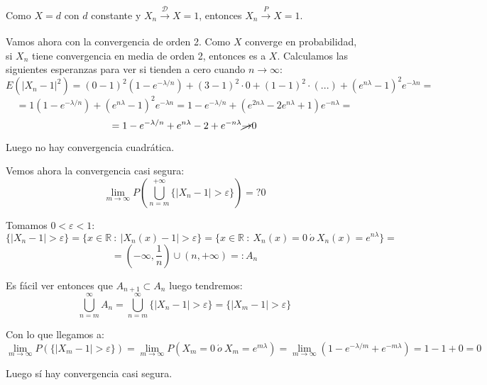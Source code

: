 \documentclass[openany]{book}
\begin{document}
\begin{exercise}
    Como $ X = d $ con $ d $ constante y $ X_n \xrightarrow[]{\mathcal{D}} X = 1 $, entonces $ X_n \xrightarrow[]{P} X=1 $.

    Vamos ahora con la convergencia de orden 2. Como $ X $ converge en probabilidad, si $ X_n $ tiene convergencia en media de orden 2, entonces es a $ X $. Calculamos las siguientes esperanzas para ver si tienden a cero cuando $ n\to\infty $:
    $$ E(|X_n-1|^2) = (0-1)^2 (1-e^{-\lambda/n})+(3-1)^2\cdot 0 + (1-1)^2\cdot (...) + (e^{n\lambda}-1)^2 e^{-\lambda n} = $$ 
    $$=1(1-e^{-\lambda/n}) + (e^{n\lambda}-1)^2e^{-\lambda n} = 1-e^{-\lambda/n} +(e^{2n\lambda}-2e^{n\lambda}+1)e^{-n\lambda} = $$
    $$ = 1-e^{-\lambda/n} + e^{n\lambda}-2+e^{-n\lambda} \cancel{\to} 0 $$

    Luego no hay convergencia cuadrática.

    Vemos ahora la convergencia casi segura:
    $$ \lim_{m \to \infty} P \left( \bigcup_{n = m}^{+\infty} \{|X_n-1|>\varepsilon\} \right) =? 0 $$

    Tomamos $ 0 < \varepsilon <1 $:
    $$ \{|X_n-1|>\varepsilon\} = \{x \in \mathbb{R}\ :\ |X_n(x)-1|>\varepsilon\} = \{x \in \mathbb{R}\ :\ X_n(x) = 0\ \acute o\ X_n (x) = e^{n\lambda}\} =$$
    $$  = (-\infty,\dfrac{1}{n}) \cup (n,+\infty) =: A_n $$

    Es fácil ver entonces que $ A_{n+1}\subset A_n $ luego tendremos:
    $$ \bigcup_{n=m}^{\infty} A_n = \bigcup_{n=m}^{\infty}\{|X_n-1|>\varepsilon\} = \{|X_m-1|>\varepsilon\}$$

    Con lo que llegamos a:
    $$ \lim_{m \to \infty}P(\{|X_m-1|>\varepsilon\}) = \lim_{m \to \infty}P(X_m = 0\ \acute o\ X_m = e^{m\lambda}) = \lim_{m \to \infty}(1-e^{-\lambda/m}+e^{-m\lambda}) = 1-1+0=0 $$

    Luego sí hay convergencia casi segura.
\end{exercise}
\end{document}

